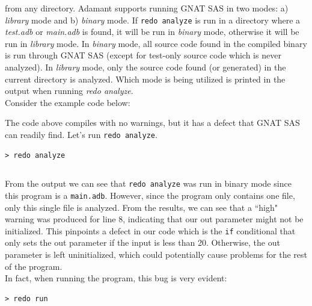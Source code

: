 from any directory. Adamant supports running GNAT SAS in two modes: a) \textit{library} mode and b) \textit{binary} mode. If \texttt{redo analyze} is run in a directory where a \textit{test.adb} or \textit{main.adb} is found, it will be run in \textit{binary} mode, otherwise it will be run in \textit{library} mode. In \textit{binary} mode, all source code found in the compiled binary is run through GNAT SAS (except for test-only source code which is never analyzed). In \textit{library} mode, only the source code found (or generated) in the current directory is analyzed. Which mode is being utilized is printed in the output when running \textit{redo analyze}. \\

Consider the example code below:


The code above compiles with no warnings, but it has a defect that GNAT SAS can readily find. Let's run \texttt{redo analyze}.

\vspace{5mm} %
\begin{verbatim}
> redo analyze
\end{verbatim}
\inputminted{text}{../example_architecture/analyze_demo/output.txt}
\vspace{5mm} %

From the output we can see that \texttt{redo analyze} was run in binary mode since this program is a \texttt{main.adb}. However, since the program only contains one file, only this single file is analyzed. From the results, we can see that a ``high" warning was produced for line 8, indicating that our out parameter might not be initialized. This pinpoints a defect in our code which is the \texttt{if} conditional that only sets the out parameter if the input is less than 20. Otherwise, the out parameter is left uninitialized, which could potentially cause problems for the rest of the program. \\

In fact, when running the program, this bug is very evident:

\vspace{5mm} %
\begin{verbatim}
> redo run 
\end{verbatim}
\inputminted{text}{../example_architecture/analyze_demo/output2.txt}
\vspace{5mm} %

